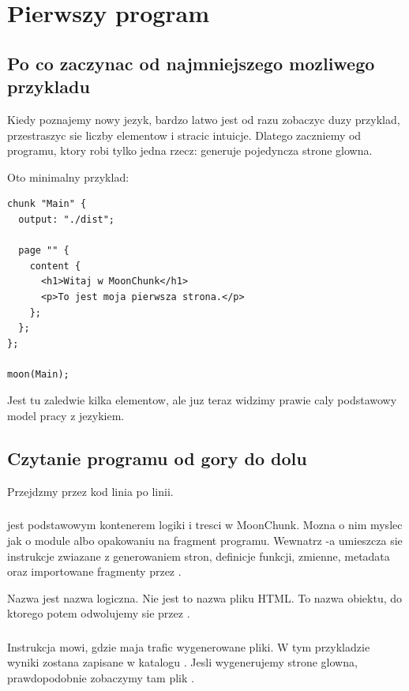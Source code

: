 \chapter{Pierwszy program}

\section{Po co zaczynac od najmniejszego mozliwego przykladu}
Kiedy poznajemy nowy jezyk, bardzo latwo jest od razu zobaczyc duzy przyklad,
przestraszyc sie liczby elementow i stracic intuicje. Dlatego zaczniemy od programu,
ktory robi tylko jedna rzecz: generuje pojedyncza strone glowna.

Oto minimalny przyklad:

\begin{lstlisting}[style=moonchunk,caption={Minimalny program w MoonChunk}]
chunk "Main" {
  output: "./dist";

  page "" {
    content {
      <h1>Witaj w MoonChunk</h1>
      <p>To jest moja pierwsza strona.</p>
    };
  };
};

moon(Main);
\end{lstlisting}

Jest tu zaledwie kilka elementow, ale juz teraz widzimy prawie caly podstawowy model
pracy z jezykiem.

\section{Czytanie programu od gory do dolu}
Przejdzmy przez kod linia po linii.

\subsection*{}
 jest podstawowym kontenerem logiki i tresci w MoonChunk. Mozna o nim
myslec jak o module albo opakowaniu na fragment programu. Wewnatrz -a
umieszcza sie instrukcje zwiazane z generowaniem stron, definicje funkcji, zmienne,
metadata oraz importowane fragmenty przez .

Nazwa  jest nazwa logiczna. Nie jest to nazwa pliku HTML. To nazwa
obiektu, do ktorego potem odwolujemy sie przez .

\subsection*{}
Instrukcja  mowi, gdzie maja trafic wygenerowane pliki. W tym przykladzie
wyniki zostana zapisane w katalogu . Jesli wygenerujemy strone glowna,
prawdopodobnie zobaczymy tam plik .

